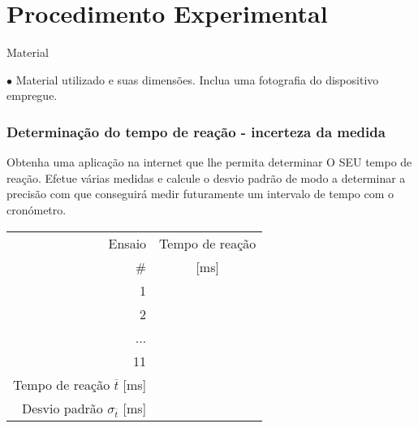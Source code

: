 \documentclass[a4paper,12pt]{article}      %
\begin{document}
\section{\sf Procedimento Experimental}
{ \large Material }
 \begin{flushleft}
	 $\bullet$	Material utilizado e suas dimensões. Inclua uma fotografia do dispositivo empregue.  \\
\end{flushleft} 

\subsubsection*{\sf Determinação do tempo de reação - incerteza da medida}
Obtenha uma aplicação na internet que lhe permita determinar O SEU tempo de reação. Efetue várias medidas e calcule o desvio padrão de modo a determinar a precisão com que conseguirá medir futuramente um intervalo de tempo com o cronómetro.





\begin{center}
\begin{footnotesize}
\begin{tabular}{|r|c|}
\hline
Ensaio  & Tempo de reação  \\
\# &  [ms] \\
\hline \hline
1 &  \\
\hline
2 & \\
\hline ... & \\
\hline 11 &  \\
\hline \hline
Tempo de reação $\overline{t}$ [ms] &  \\ \hline %
Desvio padrão  $\sigma_{\overline{t}}$ [ms] & \\
\hline

\end{tabular}
\end{footnotesize}
\end{center}
\end{document}
